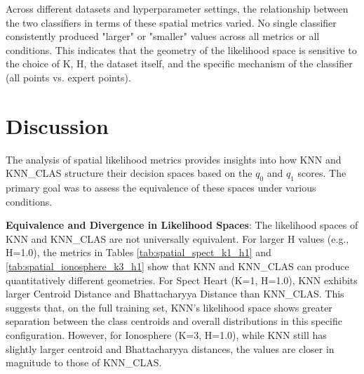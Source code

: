\documentclass[conference]{IEEEtran}
\begin{document}
\begin{table}[H]
\centering
\caption{Spatial Likelihood Metrics for Spect Heart (K=1, H=0.01) Illustrating Large Magnitudes}
\label{tab:spatial_spect_k1_h001}
\end{table}

Across different datasets and hyperparameter settings, the relationship between the two classifiers in terms of these spatial metrics varied. No single classifier consistently produced "larger" or "smaller" values across all metrics or all conditions. This indicates that the geometry of the likelihood space is sensitive to the choice of K, H, the dataset itself, and the specific mechanism of the classifier (all points vs. expert points).

\section{Discussion}
The analysis of spatial likelihood metrics provides insights into how KNN and KNN\_CLAS structure their decision spaces based on the $q_0$ and $q_1$ scores. The primary goal was to assess the equivalence of these spaces under various conditions.

\textbf{Equivalence and Divergence in Likelihood Spaces}:
The likelihood spaces of KNN and KNN\_CLAS are not universally equivalent.
For larger H values (e.g., H=1.0), the metrics in Tables \ref{tab:spatial_spect_k1_h1} and \ref{tab:spatial_ionosphere_k3_h1} show that KNN and KNN\_CLAS can produce quantitatively different geometries. For Spect Heart (K=1, H=1.0), KNN exhibits larger Centroid Distance and Bhattacharyya Distance than KNN\_CLAS. This suggests that, on the full training set, KNN's likelihood space shows greater separation between the class centroids and overall distributions in this specific configuration. However, for Ionosphere (K=3, H=1.0), while KNN still has slightly larger centroid and Bhattacharyya distances, the values are closer in magnitude to those of KNN\_CLAS.
\end{document}
